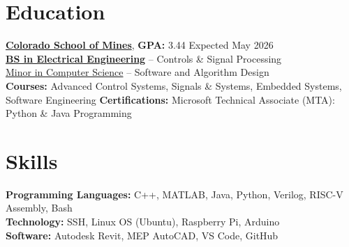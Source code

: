 \documentclass[11pt]{article}
\begin{document}
\vspace{-18pt}
\section*{Education}
\vspace{1pt}

\textbf{\href{https://www.mines.edu/}{Colorado School of Mines}}, \textbf{GPA:} 3.44  \hfill Expected May 2026\\
\textbf{\href{https://electrical.mines.edu/undergraduate-program/}{BS in Electrical Engineering}} -- Controls \& Signal Processing  \\
\href{https://cs.mines.edu/csmines-minors-and-areas-of-special-interest/}{Minor in Computer Science} -- Software and Algorithm Design\\
\textbf{Courses:} Advanced Control Systems, Signals \& Systems, Embedded Systems, Software Engineering
\textbf{Certifications:} Microsoft Technical Associate (MTA): Python \& Java Programming

\vspace{-14pt}
\section*{Skills}
\vspace{5pt}

\textbf{Programming Languages:} C++, MATLAB, Java, Python, Verilog, RISC-V Assembly, Bash \\
\textbf{Technology:} SSH, Linux OS (Ubuntu), Raspberry Pi, Arduino \\
\textbf{Software:} Autodesk Revit, MEP AutoCAD, VS Code, GitHub \\
\end{document}
